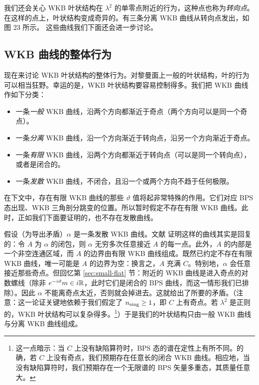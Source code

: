 
我们还会关心 WKB 叶状结构在 $\lambda^2$ 的单零点附近的行为，这种点也称为\emph{转向点}。在这样的点上，叶状结构变成奇异的。有三条分离 WKB 曲线从转向点发出，如图 23 所示。%
这些曲线我们下面还会进一步讨论。

\subsection{WKB 曲线的整体行为}\label{subsec:GlobalBehaviorWKB}

现在来讨论 WKB 叶状结构的整体行为。对黎曼面上一般的叶状结构，叶的行为可以相当狂野。幸运的是，WKB 叶状结构要容易控制得多。我们把 WKB 曲线作如下分类：
\begin{itemize}
\item 一条\emph{一般} WKB 曲线，沿两个方向都渐近于奇点（两个方向可以是同一个奇点）。
\item 一条\emph{分离} WKB 曲线，沿一个方向渐近于转向点，沿另一个方向渐近于奇点。
\item 一条\emph{有限} WKB 曲线，沿两个方向都渐近于转向点（可以是同一个转向点），或者是闭合的。
\item 一条\emph{发散} WKB 曲线，不闭合，且沿一个或两个方向不趋于任何极限。
\end{itemize}
在下文中，存在有限 WKB 曲线的那些 $\vartheta$ 值将起非常特殊的作用。它们对应 BPS 态出现、WKB 三角剖分跳变的位置。所以暂时假定不存在有限 WKB 曲线。此时，正如我们下面要证明的，也不存在发散曲线。

假设（为导出矛盾）$\alpha$ 是一条发散 WKB 曲线。文献 \cite{MR743423} 证明这样的曲线其实是回复的：令 $A$ 为 $\alpha$ 的闭包，则 $\alpha$ 无穷多次任意接近 $A$ 的每一点。此外，$A$ 的内部是一个非空连通区域，而 $A$ 的边界由有限 WKB 曲线组成。既然已约定不存在有限 WKB 曲线，唯一可能是 $A$ 的边界为空：换言之，$A$ 充满 $C$。特别地，$\alpha$ 会任意接近那些奇点。但回忆第 \ref{sec:small-flat} 节：附近的 WKB 曲线是进入奇点的对数螺线（除非 $e^{-i\vartheta} m \in i\mathbb{R}$，此时它们是闭合的 BPS 曲线，而这一情形我们已排除）。因此 $\alpha$ 不能离奇点太近，否则就会掉进去。这就给出了所要的矛盾。（注意：这一论证关键地依赖于我们假定了 $n_{\rm sing} \ge 1$，即 $C$ 上有奇点。若 $\lambda^2$ 是正则的，WKB 叶状结构可以复杂得多。\footnote{这一点暗示：当 $C$ 上没有缺陷算符时，BPS 态的谱在定性上有所不同。的确，若 $C$ 上没有奇点，我们预期存在任意长的闭合 WKB 曲线。相应地，当没有缺陷算符时，我们预期存在一个无限谱的 BPS 矢量多重态，其质量任意大。}）于是我们的叶状结构只由一般 WKB 曲线与分离 WKB 曲线组成。

